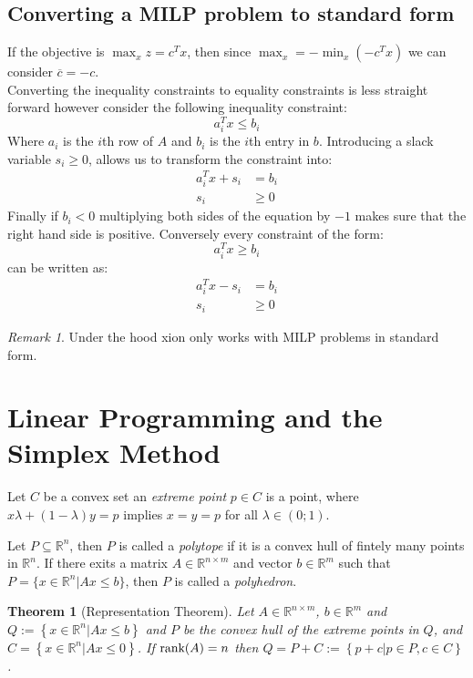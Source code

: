 \documentclass{article}
\newtheorem{theorem}{Theorem}[section]
\theoremstyle{definition}
\theoremstyle{remark}
\newtheorem*{remark}{Remark}
\newcommand{\rank}{\textnormal{rank}}
\begin{document}
\subsection{Converting a MILP problem to standard form}
If the objective is $\max_x z = c^T x$, then since $\max_x = -\min_x(-c^Tx)$ we can consider $\overline{c} = -c$. \\ Converting the inequality constraints to equality constraints is less straight forward however consider the following inequality constraint:
\begin{equation}\label{eq:cons}
   a_i^Tx \leq b_i
\end{equation}
Where $a_i$ is the $i$th row of $A$ and $b_i$ is the $i$th entry in $b$. Introducing a slack variable $s_i \geq 0$, allows us to transform the constraint into:
\begin{align*}
    a_i^T x + s_i &= b_i \\
    s_i &\geq 0
\end{align*}
Finally if $b_i < 0$ multiplying both sides of the equation by $-1$ makes sure that the right hand side is positive.
Conversely every constraint of the form:
\begin{equation}
 a_i^T x \geq b_i
\end{equation}
can be written as:
\begin{align*}
    a_i^T x - s_i &= b_i \\
    s_i &\geq 0
\end{align*}

\begin{remark}
Under the hood xion only works with MILP problems in standard form.
\end{remark}

\section{Linear Programming and the Simplex Method}

Let $C$ be a convex set an \textit{extreme point} $p \in C$ is a point, where $x \lambda + (1 - \lambda)y = p$ implies $x = y = p$ for all $\lambda \in (0; 1)$.

Let $P \subseteq \mathbb{R}^n$, then $P$ is called a \textit{polytope} if it is a convex hull of fintely many points in $\mathbb{R}^n$. If there exits a matrix $A \in \mathbb{R}^{n \times m}$ and vector $b \in \mathbb{R}^m$ such that $P = \{x \in \mathbb{R}^n \vert Ax \leq b\}$, then $P$ is called a \textit{polyhedron}.

\begin{theorem}[Representation Theorem]
  Let $A \in \mathbb{R}^{n \times m}$, $b \in \mathbb{R}^{m}$ and $Q := \left\{x \in \mathbb{R}^{n} \vert Ax   \leq b\right\}$ and $P$ be the convex hull of the extreme points in $Q$, and $C = \left\{x \in \mathbb{R}^{n} \vert Ax \leq 0\right\}$. If $\rank(A) = n$ then $Q = P + C := \left\{p + c\vert p \in P, c \in C \right\}$.
\end{theorem}
\end{document}
